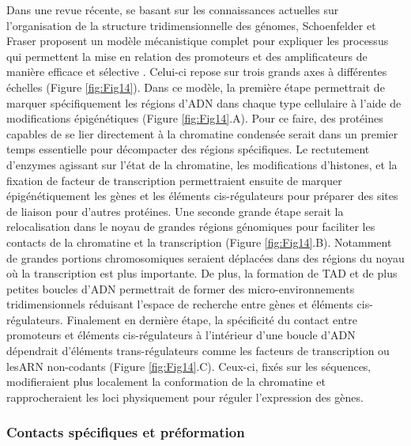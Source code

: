 Dans une revue récente, se basant sur les connaissances actuelles sur l’organisation de la structure tridimensionnelle des génomes, Schoenfelder et Fraser proposent un modèle mécanistique complet pour expliquer les processus qui permettent la mise en relation des promoteurs et des \glspl{amplificateur} de manière efficace et sélective \citep{schoenfelder_long-range_2019}. Celui-ci repose sur trois grands axes à différentes échelles (Figure \ref{fig:Fig14}). Dans ce modèle, la première étape permettrait de marquer spécifiquement les régions d’ADN dans chaque type cellulaire à l’aide de modifications épigénétiques (Figure \ref{fig:Fig14}.A). Pour ce faire, des protéines capables de se lier directement à la chromatine condensée serait dans un premier temps essentielle pour décompacter des régions spécifiques. Le rectutement d’enzymes agissant sur l’état de la chromatine, les modifications d'histones,  et la fixation de facteur de transcription permettraient ensuite de marquer épigénétiquement les gènes et les éléments \gls{cis}-régulateurs pour préparer des sites de liaison pour d’autres protéines. Une seconde grande étape serait la relocalisation dans le noyau de grandes régions génomiques pour faciliter les contacts de la chromatine et la transcription (Figure \ref{fig:Fig14}.B). Notamment de grandes portions chromosomiques seraient déplacées dans des régions du noyau où la transcription est plus importante. De plus, la formation de \acrshort{TAD} et de plus petites boucles d’ADN permettrait de former des micro-environnements tridimensionnels réduisant l’espace de recherche entre gènes et éléments \gls{cis}-régulateurs. Finalement en dernière étape, la spécificité du contact entre promoteurs et éléments \gls{cis}-régulateurs à l’intérieur d’une boucle d’ADN dépendrait d’éléments \gls{trans}-régulateurs comme les facteurs de transcription ou les\acrshort{ARN} non-codants (Figure \ref{fig:Fig14}.C). Ceux-ci, fixés sur les séquences, modifieraient plus localement la conformation de la chromatine et rapprocheraient les loci physiquement pour réguler l’expression des gènes.


\subsubsection{Contacts spécifiques et préformation}
\label{subsubsec:specifique-preformation}

